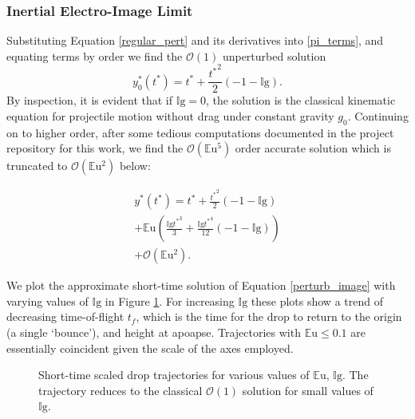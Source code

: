 \documentclass[aip,reprint, floatfix]{revtex4-1}
\begin{document}
\subsubsection{Inertial Electro-Image Limit}
Substituting Equation \ref{regular_pert} and its derivatives into \ref{pi_terms}, and equating terms by order we find the $\mathcal{O}(1)$ unperturbed solution
\[{y^*_{0}}{\left ({t^*} \right )} = {t^*} + \frac{{t^*}^{2}}{2} \left(-1 - \mathbb{I}\mbox{g}\right). \]
By inspection, it is evident that if $\mathbb{I}\mbox{g}=0$, the solution is the classical kinematic equation for projectile motion without drag under constant gravity $g_0$. Continuing on to higher order, after some tedious computations documented in the project repository for this work, \cite{schmidt_droplet_electro-bounce_2017} we find the $\mathcal{O}(\mathbb{E}\mbox{u}^5)$ order accurate solution which is truncated to $\mathcal{O}(\mathbb{E}\mbox{u}^2)$ below:

\begin{gather}
{y^*}({t^*}) = {t^*} + \frac{{t^*}^{2}}{2} \left(-1 - \mathbb{I}\mbox{g}\right) \nonumber \\
 + \mathbb{E}\mbox{u} \left(\frac{\mathbb{I}\mbox{g} {t^*}^{3}}{3} + \frac{\mathbb{I}\mbox{g} {t^*}^{4}}{12} \left(-1 - \mathbb{I}\mbox{g} \right)\right) \nonumber \\
 + \mathcal{O}(\mathbb{E}\mbox{u}^2). \label{perturb_image}
\end{gather}

We plot the approximate short-time solution of Equation \ref{perturb_image} with varying values of $\mathbb{I}\mbox{g}$ in Figure \ref{fig:short_times}. For increasing $\mathbb{I}\mbox{g}$ these plots show a trend of decreasing time-of-flight $t_f$, which is the time for the drop to return to the origin (a single `bounce'), and height at apoapse. Trajectories with $\mathbb{E}\mbox{u} \leq 0.1$ are essentially coincident given the scale of the axes employed.

\begin{figure}[htp]
    \resizebox{0.8\textwidth}{!}{}
    \caption{Short-time scaled drop trajectories for various values of $\mathbb{E}\mbox{u}$, $\mathbb{I}\mbox{g}$. The trajectory reduces to the classical $\mathcal{O}(1)$ solution for small values of $\mathbb{I}\mbox{g}$.}
    \label{fig:short_times}
\end{figure}
\end{document}

